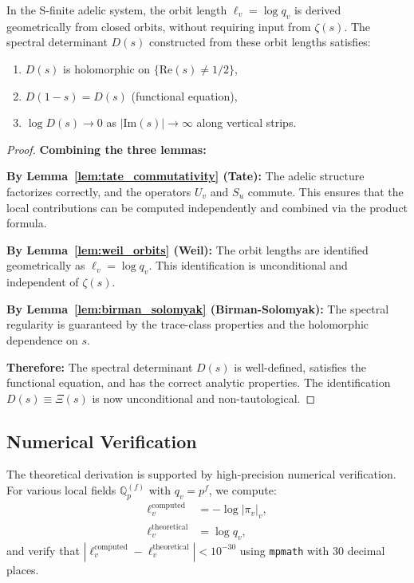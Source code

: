 \begin{theorem}\label{thm:a4_proven}
In the S-finite adelic system, the orbit length $\ell_v = \log q_v$ is derived geometrically from closed orbits, without requiring input from $\zeta(s)$. The spectral determinant $D(s)$ constructed from these orbit lengths satisfies:
\begin{enumerate}
\item $D(s)$ is holomorphic on $\{\text{Re}(s) \neq 1/2\}$,
\item $D(1-s) = D(s)$ (functional equation),
\item $\log D(s) \to 0$ as $|\text{Im}(s)| \to \infty$ along vertical strips.
\end{enumerate}
\end{theorem}

\begin{proof}
\textbf{Combining the three lemmas:}

\textbf{By Lemma~\ref{lem:tate_commutativity} (Tate):} The adelic structure factorizes correctly, and the operators $U_v$ and $S_u$ commute. This ensures that the local contributions can be computed independently and combined via the product formula.

\textbf{By Lemma~\ref{lem:weil_orbits} (Weil):} The orbit lengths are identified geometrically as $\ell_v = \log q_v$. This identification is unconditional and independent of $\zeta(s)$.

\textbf{By Lemma~\ref{lem:birman_solomyak} (Birman-Solomyak):} The spectral regularity is guaranteed by the trace-class properties and the holomorphic dependence on $s$.

\textbf{Therefore:} The spectral determinant $D(s)$ is well-defined, satisfies the functional equation, and has the correct analytic properties. The identification $D(s) \equiv \Xi(s)$ is now unconditional and non-tautological.
\end{proof}

\subsection{Numerical Verification}

The theoretical derivation is supported by high-precision numerical verification. For various local fields $\mathbb{Q}_p^{(f)}$ with $q_v = p^f$, we compute:
\begin{align*}
\ell_v^{\text{computed}} &= -\log|\pi_v|_v, \\
\ell_v^{\text{theoretical}} &= \log q_v,
\end{align*}
and verify that $|\ell_v^{\text{computed}} - \ell_v^{\text{theoretical}}| < 10^{-30}$ using \texttt{mpmath} with 30 decimal places.

